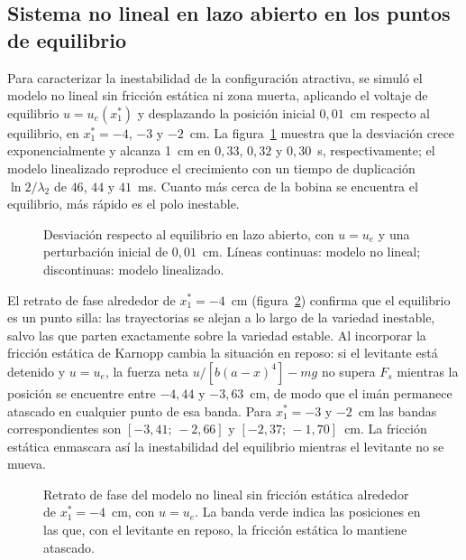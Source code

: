 \subsection{Sistema no lineal en lazo abierto en los puntos de equilibrio}

Para caracterizar la inestabilidad de la configuración atractiva, se simuló el modelo no lineal sin fricción estática ni zona muerta, aplicando el voltaje de equilibrio $u=u_e(x_1^*)$ y desplazando la posición inicial $0{,}01$~cm respecto al equilibrio, en $x_1^*=-4$, $-3$ y $-2$~cm. La figura~\ref{fig:p8_lazo_abierto} muestra que la desviación crece exponencialmente y alcanza 1~cm en $0{,}33$, $0{,}32$ y $0{,}30$~s, respectivamente; el modelo linealizado reproduce el crecimiento con un tiempo de duplicación $\ln 2/\lambda_2$ de $46$, $44$ y $41$~ms. Cuanto más cerca de la bobina se encuentra el equilibrio, más rápido es el polo inestable.

\begin{figure}[ht]
    \centering
    
    \caption[Lazo abierto en los puntos de equilibrio]{Desviación respecto al equilibrio en lazo abierto, con $u=u_e$ y una perturbación inicial de $0{,}01$~cm. Líneas continuas: modelo no lineal; discontinuas: modelo linealizado.}
    \label{fig:p8_lazo_abierto}
\end{figure}

El retrato de fase alrededor de $x_1^*=-4$~cm (figura~\ref{fig:p8_retrato}) confirma que el equilibrio es un punto silla: las trayectorias se alejan a lo largo de la variedad inestable, salvo las que parten exactamente sobre la variedad estable. Al incorporar la fricción estática de Karnopp cambia la situación en reposo: si el levitante está detenido y $u=u_e$, la fuerza neta $u/[b(a-x)^4]-mg$ no supera $F_s$ mientras la posición se encuentre entre $-4{,}44$ y $-3{,}63$~cm, de modo que el imán permanece atascado en cualquier punto de esa banda. Para $x_1^*=-3$ y $-2$~cm las bandas correspondientes son $[-3{,}41;\,-2{,}66]$ y $[-2{,}37;\,-1{,}70]$~cm. La fricción estática enmascara así la inestabilidad del equilibrio mientras el levitante no se mueva.

\begin{figure}[ht]
    \centering
    
    \caption[Retrato de fase en lazo abierto]{Retrato de fase del modelo no lineal sin fricción estática alrededor de $x_1^*=-4$~cm, con $u=u_e$. La banda verde indica las posiciones en las que, con el levitante en reposo, la fricción estática lo mantiene atascado.}
    \label{fig:p8_retrato}
\end{figure}

\FloatBarrier
